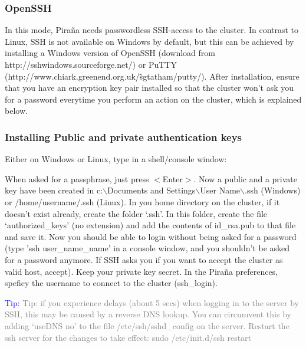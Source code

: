\documentclass[a4,11pt]{report} \usepackage[pdftex]{graphicx}
\begin{document}
{\subsubsection*{OpenSSH} In this mode, Pira\~na needs passwordless
SSH-access to the cluster. In contrast to Linux, SSH is not available
on Windows by default, but this can be achieved by installing a
Windows version of OpenSSH (download from
http://sshwindows.sourceforge.net/) or PuTTY
(http://www.chiark.greenend.org.uk/\~ sgtatham/putty/). After
installation, ensure that you have an encryption key pair installed so
that the cluster won't ask you for a password everytime you perform an
action on the cluster, which is explained below.

\subsubsection*{Installing Public and private authentication keys}

Either on Windows or Linux, type in a shell/console window:

\vspace{6pt} \normalfont \vspace{6pt}

\noindent When asked for a passphrase, just press $<$Enter$>$.  Now a
public and a private key have been created in c:$\backslash$Documents
and Settings$\backslash$User Name$\backslash$.ssh
(Windows) or /home/username/.ssh (Linux).  In you home directory on
the cluster, if it doesn't exist already, create the folder `.ssh'. In
this folder, create the file `authorized\_keys' (no extension) and add
the contents of id\_rsa.pub to that file and save it. Now you should
be able to login without being asked for a password (type 'ssh
user\_name\@cluster\_name' in a console window, and you shouldn't be
asked for a password anymore. If SSH asks you if you want to accept
the cluster as valid host, accept). Keep your private key secret. In
the Pira\~na preferences, speficy the username to connect to the cluster
(ssh\_login).

\vspace{10pt}
\noindent\scriptsize{\textcolor{Blue}{Tip:} \textcolor{Grey} {Tip: if you experience delays (about 5 secs) when logging in to the
server by SSH, this may be caused by a reverse DNS lookup. You can
circumvent this by adding `useDNS no' to the file /etc/ssh/sshd\_config
on the server. Restart the ssh server for the changes to take effect:
sudo /etc/init.d/ssh restart}
\normalsize


}}
\end{document}
